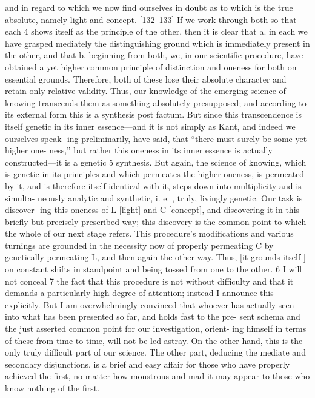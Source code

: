 and in regard to which we now find ourselves in doubt as to which is the true
absolute, namely light and concept.
 [132–133] If we work through both so that
each 4 shows itself as the principle of the other, then it is clear that
a.
 in each we have grasped mediately the distinguishing ground which is
immediately present in the other, and that
b.
 beginning from both, we, in our scientific procedure, have obtained a yet
higher common principle of distinction and oneness for both on essential
grounds.
Therefore, both of these lose their absolute character and retain only relative
validity.
 Thus, our knowledge of the emerging science of knowing transcends
them as something absolutely presupposed; and according to its external form
this is a synthesis post factum.
 But since this transcendence is itself genetic in
its inner essence—and it is not simply as Kant, and indeed we ourselves speak-
ing preliminarily, have said, that “there must surely be some yet higher one-
ness,” but rather this oneness in its inner essence is actually constructed—it is
a genetic 5 synthesis.
 But again, the science of knowing, which is genetic in its
principles and which permeates the higher oneness, is permeated by it, and is
therefore itself identical with it, steps down into multiplicity and is simulta-
neously analytic and synthetic, i.
e.
, truly, livingly genetic.
 Our task is discover-
ing this oneness of L [light] and C [concept], and discovering it in this briefly
but precisely prescribed way; this discovery is the common point to which the
whole of our next stage refers.
 This procedure’s modifications and various
turnings are grounded in the necessity now of properly permeating C by
genetically permeating L, and then again the other way.
 Thus, [it grounds
itself ] on constant shifts in standpoint and being tossed from one to the
other.
 6 I will not conceal 7 the fact that this procedure is not without difficulty
and that it demands a particularly high degree of attention; instead I
announce this explicitly.
 But I am overwhelmingly convinced that whoever
has actually seen into what has been presented so far, and holds fast to the pre-
sent schema and the just asserted common point for our investigation, orient-
ing himself in terms of these from time to time, will not be led astray.
 On the
other hand, this is the only truly difficult part of our science.
 The other part,
deducing the mediate and secondary disjunctions, is a brief and easy affair for
those who have properly achieved the first, no matter how monstrous and mad
it may appear to those who know nothing of the first.
